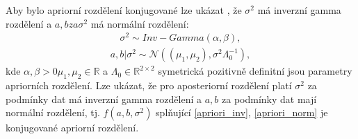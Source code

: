 \documentclass[czech,master,public,dept470,male,cpdeclaration,oneside, python]{diploma}
\begin{document}
Aby bylo apriorní rozdělení konjugované lze ukázat \cite{robert2007bayesian}, že $\sigma^2$ má inverzní gamma rozdělení a $a,b za \sigma^2$ má normální rozdělení:
\begin{align} \label{apriori_inv}
	\sigma^2 \sim Inv-Gamma(\alpha, \beta), 
\end{align}
\begin{align}\label{apriori_norm}
	a, b | \sigma^2 \sim \mathcal{N}((\mu_1, \mu_2), \sigma^2\Lambda_0^{-1}),
\end{align}
kde $\alpha, \beta > 0 \mu_1, \mu_2 \in \mathbb{R}$ a $\Lambda_0 \in \mathbb{R}^{2\times2}$ symetrická pozitivně definitní jsou parametry apriorních rozdělení. Lze ukázat, že pro aposteriorní rozdělení platí $\sigma^2$ za podmínky dat má inverzní gamma rozdělení a $a,b$ za podmínky dat mají normální rozdělení, tj. $f(a,b,\sigma^2)$ splňující \eqref{apriori_inv}, \eqref{apriori_norm} je konjugované apriorní rozdělení. \par
\end{document}
